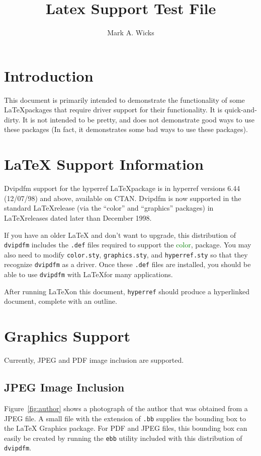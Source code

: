 \documentclass[dvipdfm]{article}
\title{\color{blue}Latex Support Test File}
\author{\color{green}Mark A. Wicks}
\begin{document}
\maketitle
\section{Introduction}
This document is primarily intended
to demonstrate the functionality
of some \LaTeX packages that require
driver support for their functionality.
It is quick-and-dirty.
It is not intended to be pretty, and
does not demonstrate good ways to use these packages
(In fact, it demonstrates some bad ways to use these packages).

\section{LaTeX Support Information}
Dvipdfm support for the hyperref \LaTeX\space package is 
in hyperref versions 6.44 (12/07/98) and above, available on CTAN.
Dvipdfm is now supported in the
standard \LaTeX\space release (via the ``color'' and ``graphics'' packages) in
\LaTeX\space releases dated later than December 1998.

If you have an older LaTeX and don't want to upgrade,
this distribution of {\tt dvipdfm} includes
the {\tt .def} files required to support
the \textcolor{green}{color},
 package.
You may also need to modify {\tt color.sty}, {\tt graphics.sty},
and {\tt hyperref.sty} so that they
recognize {\tt dvipdfm} as a driver.
Once these {\tt .def} files are installed,
you should be able to use {\tt dvipdfm}
with \LaTeX for many applications.

After running \LaTeX on this
document, {\tt hyperref}
should produce a hyperlinked
document, complete with an outline.

\newpage
\section{Graphics Support}
Currently, JPEG and PDF image
inclusion are supported.

\subsection{JPEG Image Inclusion}
Figure~\ref{fig:author}
shows a photograph of the author
that was obtained from a JPEG file.
A small file with the extension of {\tt .bb}
supplies the bounding box to the \LaTeX\space
Graphics package.  For PDF and JPEG files,
this bounding box can easily be created by running
the {\tt ebb} utility included with this
distribution of {\tt dvipdfm}.
\end{document}
